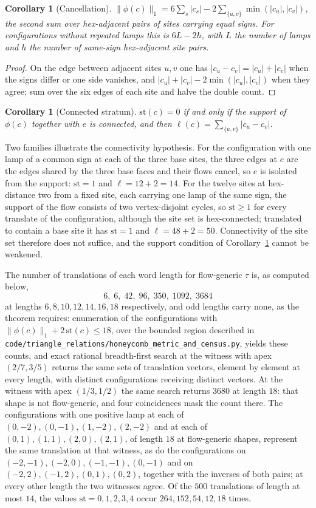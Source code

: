 \documentclass[11pt]{article}
\newtheorem{corollary}[theorem]{Corollary}
\theoremstyle{definition}
\theoremstyle{remark}
\begin{document}
\begin{corollary}[Cancellation]\label{cor:cancel}
$\|\phi(c)\|_1=6\sum_s|c_s|-2\sum_{\{u,v\}}\min(|c_u|,|c_v|)$, the second
sum over hex-adjacent pairs of sites carrying equal signs. For
configurations without repeated lamps this is $6L-2h$, with $L$ the number
of lamps and $h$ the number of same-sign hex-adjacent site pairs.
\end{corollary}

\begin{proof}
On the edge between adjacent sites $u,v$ one has $|c_u-c_v|=|c_u|+|c_v|$
when the signs differ or one side vanishes, and
$|c_u|+|c_v|-2\min(|c_u|,|c_v|)$ when they agree; sum over the six edges of
each site and halve the double count.
\end{proof}

\begin{corollary}[Connected stratum]\label{cor:connected}
$\mathrm{st}(c)=0$ if and only if the support of $\phi(c)$ together with $e$
is connected, and then $\ell(c)=\sum_{\{u,v\}}|c_u-c_v|$.
\end{corollary}

Two families illustrate the connectivity hypothesis. For the configuration
with one lamp of a common sign at each of the three base sites, the three
edges at $e$ are the edges shared by the three base faces and their flows
cancel, so $e$ is isolated from the support: $\mathrm{st}=1$ and
$\ell=12+2=14$. For the twelve sites at hex-distance two from a fixed site,
each carrying one lamp of the same sign, the support of the flow consists of
two vertex-disjoint cycles, so $\mathrm{st}\ge1$ for every translate of the
configuration, although the site set is hex-connected; translated to contain
a base site it has $\mathrm{st}=1$ and $\ell=48+2=50$. Connectivity of the
site set therefore does not suffice, and the support condition of
Corollary~\ref{cor:connected} cannot be weakened.

The number of translations of each word length for flow-generic $\tau$ is,
as computed below,
\[
 6,\;6,\;42,\;96,\;350,\;1092,\;3684
\]
at lengths $6,8,10,12,14,16,18$ respectively, and odd lengths carry none, as
the theorem requires: enumeration of the configurations with
$\|\phi(c)\|_1+2\,\mathrm{st}(c)\le18$, over the bounded region described in
\texttt{code/triangle\_relations/honeycomb\_metric\_and\_census.py}, yields
these counts, and exact rational breadth-first
search at the witness with apex $(2/7,3/5)$ returns the same sets of
translation vectors, element by element at every length, with distinct
configurations receiving distinct vectors. At the witness with
apex $(1/3,1/2)$ the same search returns $3680$ at length $18$: that shape is
not flow-generic, and four coincidences mask the count there. The
configurations with one positive lamp at each of $(0,-2),(0,-1),(1,-2),(2,-2)$
and at each of $(0,1),(1,1),(2,0),(2,1)$, of length $18$ at flow-generic
shapes, represent the same translation at that witness, as do the
configurations on $(-2,-1),(-2,0),(-1,-1),(0,-1)$ and on
$(-2,2),(-1,2),(0,1),(0,2)$, together with the inverses of both pairs; at
every other length the two witnesses agree. Of the $500$ translations of
length at most $14$, the values $\mathrm{st}=0,1,2,3,4$ occur
$264,152,54,12,18$ times.
\end{document}
